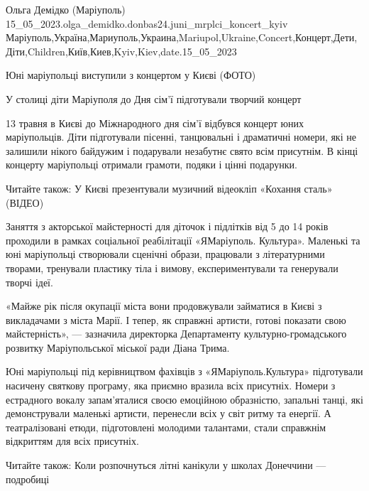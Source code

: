  
 
 
 
 

Ольга Демідко (Маріуполь)
15_05_2023.olga_demidko.donbas24.juni_mrplci_koncert_kyiv
Маріуполь,Україна,Мариуполь,Украина,Mariupol,Ukraine,Concert,Концерт,Дети,Діти,Children,Київ,Киев,Kyiv,Kiev,date.15_05_2023

Юні маріупольці виступили з концертом у Києві (ФОТО)

У столиці діти Маріуполя до Дня сім'ї підготували творчий концерт

13 травня в Києві до Міжнародного дня сім'ї відбувся концерт юних маріупольців.
Діти підготували пісенні, танцювальні і драматичні номери, які не залишили
нікого байдужим і подарували незабутнє свято всім присутнім. В кінці концерту
маріупольці отримали грамоти, подяки і цінні подарунки.

Читайте також: У Києві презентували музичний відеокліп «Кохання сталь» (ВІДЕО)

Заняття з акторської майстерності для діточок і підлітків від 5 до 14 років
проходили в рамках соціальної реабілітації «ЯМаріуполь. Культура». Маленькі та
юні маріупольці створювали сценічні образи, працювали з літературними творами,
тренували пластику тіла і вимову, експериментували та генерували творчі ідеї.

«Майже рік після окупації міста вони продовжували займатися в Києві з
викладачами з міста Марії. І тепер, як справжні артисти, готові показати свою
майстерність», — зазначила директорка Департаменту культурно-громадського
розвитку Маріупольської міської ради Діана Трима.

Юні маріупольці під керівництвом фахівців з «ЯМаріуполь.Культура» підготували
насичену святкову програму, яка приємно вразила всіх присутніх. Номери з
естрадного вокалу запам’яталися своєю емоційною образністю, запальні танці, які
демонстрували маленькі артисти, перенесли всіх у світ ритму та енергії. А
театралізовані етюди, підготовлені молодими талантами, стали справжнім
відкриттям для всіх присутніх.

Читайте також: Коли розпочнуться літні канікули у школах Донеччини — подробиці

